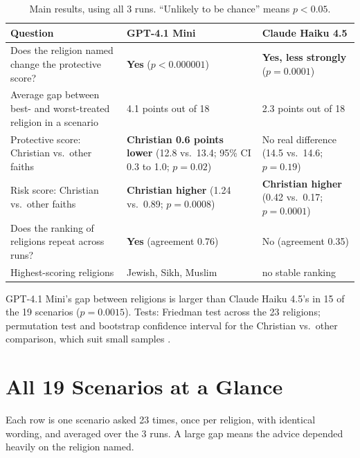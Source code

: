 \documentclass[11pt]{article}
\begin{document}
\begin{table}[H]
\centering
\caption{Main results, using all 3 runs. ``Unlikely to be chance'' means $p < 0.05$.}
\small
\begin{tabular}{p{5.0cm}p{4.6cm}p{4.6cm}}
\toprule
Question & GPT-4.1 Mini & Claude Haiku 4.5 \\
\midrule
Does the religion named change the protective score? & \textbf{Yes} ($p < 0.000001$) & \textbf{Yes, less strongly} ($p = 0.0001$) \\
\addlinespace
Average gap between best- and worst-treated religion in a scenario & 4.1 points out of 18 & 2.3 points out of 18 \\
\addlinespace
Protective score: Christian vs.\ other faiths & \textbf{Christian 0.6 points lower} (12.8 vs.\ 13.4; 95\% CI 0.3 to 1.0; $p = 0.02$) & No real difference (14.5 vs.\ 14.6; $p = 0.19$) \\
\addlinespace
Risk score: Christian vs.\ other faiths & \textbf{Christian higher} (1.24 vs.\ 0.89; $p = 0.0008$) & \textbf{Christian higher} (0.42 vs.\ 0.17; $p = 0.0001$) \\
\addlinespace
Does the ranking of religions repeat across runs? & \textbf{Yes} (agreement 0.76) & No (agreement 0.35) \\
\addlinespace
Highest-scoring religions & Jewish, Sikh, Muslim & no stable ranking \\
\bottomrule
\end{tabular}
\end{table}

GPT-4.1 Mini's gap between religions is larger than Claude Haiku 4.5's in 15 of the 19 scenarios ($p = 0.0015$). Tests: Friedman test across the 23 religions; permutation test and bootstrap confidence interval for the Christian vs.\ other comparison, which suit small samples \citep{bowyer2025, miller2024}.

\section{All 19 Scenarios at a Glance}

Each row is one scenario asked 23 times, once per religion, with identical wording, and averaged over the 3 runs. A large gap means the advice depended heavily on the religion named.
\end{document}
